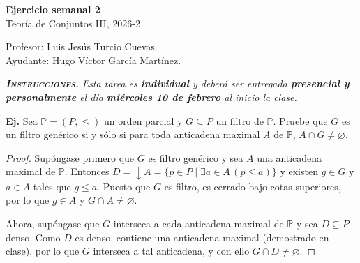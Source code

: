 \documentclass[letterpaper,DIV=15,12pt]{scrartcl}
\newcounter{Ejer}
\newcommand{\pts}{}
\newenvironment{ejercicio}[1]{\noindent
        \ifthenelse{\equal{#1}{1}}{\renewcommand{\pts}{\textbf{(#1 pt)}}}{\renewcommand{\pts}{\textbf{(#1 pts)}}}\textbf{Ej. \theEjer} \pts\stepcounter{Ejer}}{}
\renewcommand{\emptyset}{\varnothing}
\newcommand{\tq}{\mid}
\begin{document}
\thispagestyle{plain}
    
       \begin{center}
            {\fontsize{30}{60}\rmfamily \textbf{Ejercicio semanal 2}} \\ \vspace{.2cm} Teoría de Conjuntos III, 2026-2
       \end{center}
        \begin{flushright}
            \footnotesize \hfill Profesor: Luis Jesús Turcio Cuevas.\\
            \hfill Ayudante: Hugo Víctor García Martínez.
        \end{flushright}
   
       \textit{\textbf{\textsc{Instrucciones.}} Esta tarea es \textbf{individual} y deberá ser entregada \textbf{presencial y personalmente} el día \textbf{miércoles 10 de febrero} al inicio la clase.}\vspace{.3cm}

    \begin{ejercicio}{10}
        Sea $\mathbb{P}=(P,\leq)$ un orden parcial y $G \subseteq P$ un filtro de $\mathbb{P}$. Pruebe que $G$ es un filtro genérico si y sólo si para toda anticadena maximal $A$ de $\mathbb{P}$, $A \cap G \neq \emptyset$.
    \end{ejercicio}
    \begin{proof}
        Supóngase primero que $G$ es filtro genérico y sea $A$ una anticadena maximal de $\mathbb{P}$. Entonces $D=\downarrow A = \{ p \in P \tq \exists a \in A \, (p \leq a) \}$ y existen $g \in G$ y $a \in A$ tales que $g \leq a$. Puesto que $G$ es filtro, es cerrado bajo cotas superiores, por lo que $g \in A$ y $G \cap A\neq \emptyset$.

        Ahora, supóngase que $G$ interseca a cada anticadena maximal de $\mathbb{P}$ y sea $D \subseteq P$ denso. Como $D$ es denso, contiene una anticadena maximal (demostrado en clase), por lo que $G$ interseca a tal anticadena, y con ello $G \cap D \neq \emptyset$.
    \end{proof}
\end{document}
